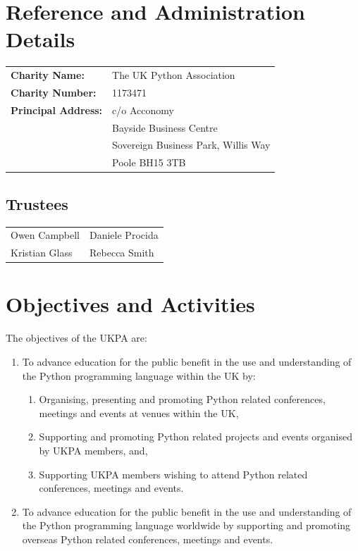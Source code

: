 \documentclass[11pt, final]{article}
\begin{document}

\section{Reference and Administration Details}
\begin{tabular}{l l}
	\textbf{Charity Name:}      & The UK Python Association \\
	\textbf{Charity Number:}    & 1173471                   \\
	\textbf{Principal Address:} & c/o Acconomy              \\
	                            & Bayside Business Centre     \\
	                            & Sovereign Business Park, Willis Way            \\
	                            & Poole BH15 3TB            \\
\end{tabular}

\subsection{Trustees}
\begin{tabular}{l l}
	Owen Campbell  & Daniele Procida \\
	Kristian Glass & Rebecca Smith \\
\end{tabular}

\section{Objectives and Activities}
The objectives of the UKPA are:
\begin{enumerate}
	\item To advance education for the public benefit in the use and understanding of the Python programming language within the UK by:
	      \begin{enumerate}
		      \item Organising, presenting and promoting Python related conferences, meetings and events at venues within the UK,
		      \item Supporting and promoting Python related projects and events organised by UKPA members, and,
		      \item Supporting UKPA members wishing to attend Python related conferences, meetings and events.
	      \end{enumerate}
	\item To advance education for the public benefit in the use and understanding of the Python programming language worldwide by supporting and promoting overseas Python related conferences, meetings and events.
\end{enumerate}
\end{document}
